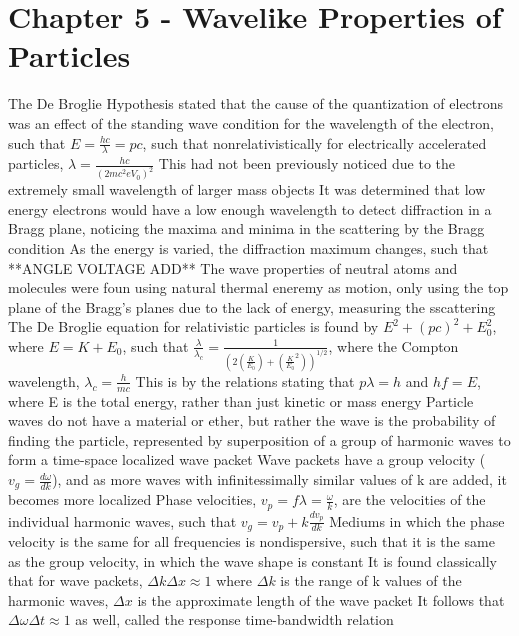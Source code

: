 \documentclass[11 pt, twoside]{article}
\newenvironment{outline*}
{
	\begin{outline}[enumerate]
	}
	{\end{outline}
}
\begin{document}
\section{Chapter 5 - Wavelike Properties of Particles}
\begin{outline*}
\1 The De Broglie Hypothesis stated that the cause of the quantization of electrons was an effect of the standing wave condition for the wavelength of the electron, such that $E = \frac{hc}{\lambda} = pc$, such that nonrelativistically for electrically accelerated particles, $\lambda = \frac{hc}{(2mc^2eV_0)^2}$
	\2 This had not been previously noticed due to the extremely small wavelength of larger mass objects
	\2 It was determined that low energy electrons would have a low enough wavelength to detect diffraction in a Bragg plane, noticing the maxima and minima in the scattering by the Bragg condition
		\3 As the energy is varied, the diffraction maximum changes, such that **ANGLE VOLTAGE ADD**
	\2 The wave properties of neutral atoms and molecules were foun using natural thermal eneremy as motion, only using the top plane of the Bragg's planes due to the lack of energy, measuring the sscattering
\1 The De Broglie equation for relativistic particles is found by $E^2 + (pc)^2 + E_0^2$, where $E = K + E_0$, such that $\frac{\lambda}{\lambda_c} = \frac{1}{(2(\frac{K}{E_0}) + (\frac{K}{E_0}^2))^{1/2}}$, where the Compton wavelength, $\lambda_c = \frac{h}{mc}$
	\2 This is by the relations stating that $p\lambda = h$ and $hf = E$, where E is the total energy, rather than just kinetic or mass energy
\1 Particle waves do not have a material or ether, but rather the wave is the probability of finding the particle, represented by superposition of a group of harmonic waves to form a time-space localized wave packet
	\2 Wave packets have a group velocity ($v_g = \frac{d\omega}{dk}$), and as more waves with infinitessimally similar values of k are added, it becomes more localized
		\3 Phase velocities, $v_p = f\lambda = \frac{\omega}{k}$, are the velocities of the individual harmonic waves, such that $v_g = v_p + k\frac{dv_p}{dk}$
		\3 Mediums in which the phase velocity is the same for all frequencies is nondispersive, such that it is the same as the group velocity, in which the wave shape is constant
	\2 It is found classically that for wave packets, $\Delta k \Delta x \approx 1$ where $\Delta k$ is the range of k values of the harmonic waves, $\Delta x$ is the approximate length of the wave packet
		\3 It follows that $\Delta \omega \Delta t \approx 1$ as well, called the response time-bandwidth relation

\end{outline*}
\end{document}
